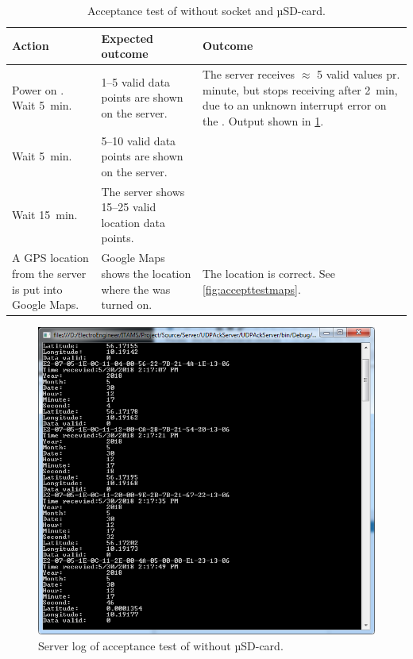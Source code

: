 \begin{table}[H]
	\centering
	\begin{tabularx}{\textwidth}{p{4.3cm} X X}
		\toprule
		\textbf{Action} & \textbf{Expected outcome} & \textbf{Outcome} \\
		\midrule
		Power on \systemName. Wait \SI{5}{\minute}. & \numrange{1}{5} valid data points are shown on the server. & The server receives $\approx$ 5 valid values pr. minute, but stops receiving after \SI{2}{\minute}, due to an unknown interrupt error on the \SAMD. Output shown in \cref{fig:accepttestconsole}. \\
		Wait \SI{5}{\minute}. & \numrange{5}{10} valid data points are shown on the server. & \\
		Wait \SI{15}{\minute}. & The server shows \numrange{15}{25} valid location data points. & \\
		A GPS location from the server is put into Google Maps. & Google Maps shows the location where the \systemName was turned on. & The location is correct. See \cref{fig:accepttestmaps}. \\
		\bottomrule
	\end{tabularx}
	\caption{Acceptance test of \systemName without \SDsock socket and µSD-card.}
	\label{AT:withoutSD}
\end{table}

\begin{figure}
	\centering
	\includegraphics[width=0.9\linewidth]{gfx/Test/AcceptTestConsole.PNG}
	\caption{Server log of acceptance test of \systemName without µSD-card.}
	\label{fig:accepttestconsole}
\end{figure}

